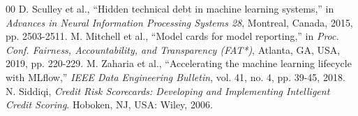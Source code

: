 \documentclass[journal,10pt]{IEEEtran}
\begin{document}
\begin{thebibliography}{00}
 D. Sculley et al., ``Hidden technical debt in machine learning systems,'' in \emph{Advances in Neural Information Processing Systems 28}, Montreal, Canada, 2015, pp. 2503-2511.
 M. Mitchell et al., ``Model cards for model reporting,'' in \emph{Proc. Conf. Fairness, Accountability, and Transparency (FAT*)}, Atlanta, GA, USA, 2019, pp. 220-229.
 M. Zaharia et al., ``Accelerating the machine learning lifecycle with MLflow,'' \emph{IEEE Data Engineering Bulletin}, vol. 41, no. 4, pp. 39-45, 2018.
 N. Siddiqi, \emph{Credit Risk Scorecards: Developing and Implementing Intelligent Credit Scoring}. Hoboken, NJ, USA: Wiley, 2006.
\end{thebibliography}
\end{document}

